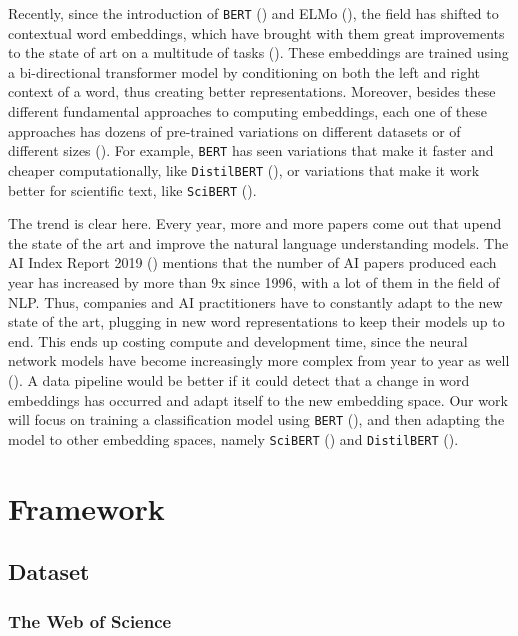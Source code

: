 \documentclass[12pt]{extreport}
\begin{document}
Recently, since the introduction of \texttt{BERT} (\cite{bert}) and ELMo (\cite{elmo}), the field has shifted to contextual word embeddings, which have brought with them great improvements to the state of art on a multitude of tasks (\cite{bert}). These embeddings are trained using a bi-directional transformer model by conditioning on both the left and right context of a word, thus creating better representations. Moreover, besides these different fundamental approaches to computing embeddings, each one of these approaches has dozens of pre-trained variations on different datasets or of different sizes (\cite{huggingface}). For example, \texttt{BERT} has seen variations that make it faster and cheaper computationally, like \texttt{DistilBERT} (\cite{distilbert}), or variations that make it work better for scientific text, like \texttt{SciBERT} (\cite{scibert}).

The trend is clear here. Every year, more and more papers come out that upend the state of the art and improve the natural language understanding models. The AI Index Report 2019 (\cite{aiindex2019}) mentions that the number of AI papers produced each year has increased by more than 9x since 1996, with a lot of them in the field of NLP. Thus, companies and AI practitioners have to constantly adapt to the new state of the art, plugging in new word representations to keep their models up to end. This ends up costing compute and development time, since the neural network models have become increasingly more complex from year to year as well (\cite{aiindex2019}). A data pipeline would be better if it could detect that a change in word embeddings has occurred and adapt itself to the new embedding space. Our work will focus on training a classification model using \texttt{BERT} (\cite{bert}), and then adapting the model to other embedding spaces, namely \texttt{SciBERT} (\cite{scibert}) and \texttt{DistilBERT} (\cite{distilbert}).

\chapter{Framework}

\section{Dataset}

\subsection{The Web of Science} \label{wos}
\end{document}
